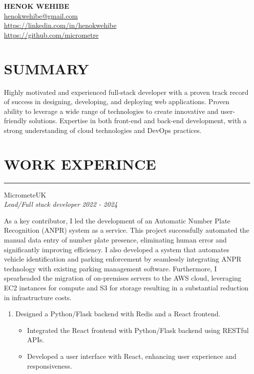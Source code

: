 \documentclass{article}
\begin{document}
\begin{center}
\textbf{\huge HENOK WEHIBE} \\
\vspace{1.5em}
\href{mailto:henokwehibe@gmail.com}{henokwehibe@gmail.com} \\
\vspace{1.0em}
\href{https://linkedin.com/in/henokwehibe}{https://linkedin.com/in/henokwehibe}\\
\vspace{1.0em}
\href{https://github.com/micrometre}{https://github.com/micrometre }\\
\end{center}
\vspace{-4.6em}
\section*{SUMMARY} 
{ Highly motivated and experienced full-stack developer with a proven track record of success in designing, developing, and deploying web applications. Proven ability to leverage a wide range of technologies to create innovative and user-friendly solutions. Expertise in both front-end and back-end development, with a strong understanding of cloud technologies and DevOps practices.} \hfill 
\vspace{-4.6em}
\section* {WORK EXPERINCE}
\vspace{0.6em}
\hrule 
{\bf}{} MicrometeUK \hfill {} \\%
{\em Lead/Full stack developer} \hfill {\em 2022 - 2024 } %

As a key contributor, I led the development of an Automatic Number Plate Recognition (ANPR) system as a service. 
This project successfully automated the manual data entry of number plate presence, eliminating human error and significantly improving efficiency. 
I also developed a system that automates vehicle identification and parking enforcement by seamlessly integrating ANPR technology with existing parking management software.
Furthermore, I spearheaded the migration of on-premises servers to the AWS cloud, 
leveraging EC2 instances for compute and  S3 for storage resulting in a substantial reduction in infrastructure costs.



\begin{enumerate}
    \item[] Designed a Python/Flask backend with Redis and a React frontend. 
   \begin{itemize}
    \item Integrated the React frontend with  Python/Flask backend using RESTful APIs.
    \item Developed a  user interface with React, enhancing user experience and responsiveness.
   \end{itemize}
\end{enumerate}
\end{document}
